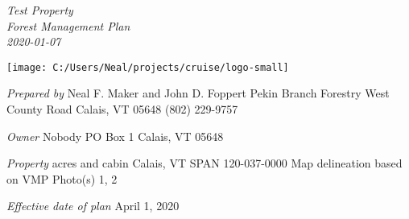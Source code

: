 \documentclass[]{tufte-handout}
\date{}
\begin{document}
\thispagestyle{empty}

\LARGE \emph{Test Property}\\
\Large \emph{Forest Management Plan}\\
\Large \emph{2020-01-07}

\begin{marginfigure}

{\centering \texttt{[image: C:/Users/Neal/projects/cruise/logo-small]} 

}

\end{marginfigure}

\normalsize 

\begin{marginfigure}
\noindent \textit{\large Prepared by} 
\newline\indent Neal F. Maker and John D. Foppert  
\newline\indent Pekin Branch Forestry  
\newline{} West County Road  
\newline\indent Calais, VT 05648  
\newline\indent (802) 229-9757  
\end{marginfigure}

\begin{marginfigure}
\noindent \textit{\large Owner}
\newline\indent Nobody  
\newline\indent PO Box 1
\indent 
\newline\indent Calais, VT 05648  
\end{marginfigure}

\begin{marginfigure}
\noindent \textit{\large Property}   
\newline{} acres and cabin   
\newline\indent Calais, VT  
\newline\indent SPAN 120-037-0000  
\newline\indent Map delineation based on VMP  
\newline\indent Photo(s) 1, 2  
\end{marginfigure}

\begin{marginfigure}
\noindent \textit{\large Effective date of plan}  
\newline\indent April 1, 2020  
\end{marginfigure}
\end{document}
